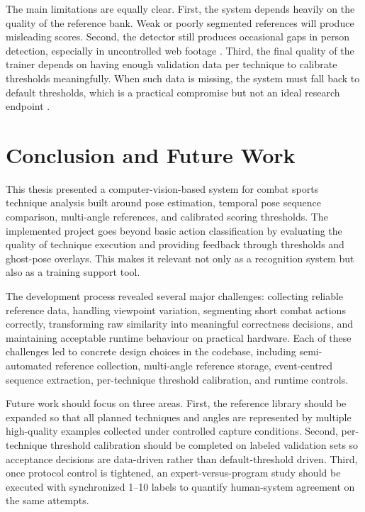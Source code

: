 \documentclass[12pt]{article}
\begin{document}
The main limitations are equally clear. First, the system depends heavily on the quality of the reference bank. Weak or poorly segmented references will produce misleading scores. Second, the detector still produces occasional gaps in person detection, especially in uncontrolled web footage \cite{projectFrontKickLog,projectFrontKickStrictLog}. Third, the final quality of the trainer depends on having enough validation data per technique to calibrate thresholds meaningfully. When such data is missing, the system must fall back to default thresholds, which is a practical compromise but not an ideal research endpoint \cite{projectCalibrate}.

\section{Conclusion and Future Work}
This thesis presented a computer-vision-based system for combat sports technique analysis built around pose estimation, temporal pose sequence comparison, multi-angle references, and calibrated scoring thresholds. The implemented project goes beyond basic action classification by evaluating the quality of technique execution and providing feedback through thresholds and ghost-pose overlays. This makes it relevant not only as a recognition system but also as a training support tool.

The development process revealed several major challenges: collecting reliable reference data, handling viewpoint variation, segmenting short combat actions correctly, transforming raw similarity into meaningful correctness decisions, and maintaining acceptable runtime behaviour on practical hardware. Each of these challenges led to concrete design choices in the codebase, including semi-automated reference collection, multi-angle reference storage, event-centred sequence extraction, per-technique threshold calibration, and runtime controls.

Future work should focus on three areas. First, the reference library should be expanded so that all planned techniques and angles are represented by multiple high-quality examples collected under controlled capture conditions. Second, per-technique threshold calibration should be completed on labeled validation sets so acceptance decisions are data-driven rather than default-threshold driven. Third, once protocol control is tightened, an expert-versus-program study should be executed with synchronized 1--10 labels to quantify human-system agreement on the same attempts.

\printbibliography
\end{document}
